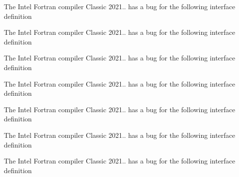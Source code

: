 
\begin{DoxyRefList}
\item[Type \mbox{\hyperlink{interfaceArrayFind__mod_1_1genReplaced}{Array\+Find\+\_\+mod\+::gen\+Replaced}} ]\label{bug__bug000001}%
%
 The Intel Fortran compiler Classic 2021.. has a bug for the following interface definition  
\item[Type \mbox{\hyperlink{interfaceArrayFind__mod_1_1getReplaced}{Array\+Find\+\_\+mod\+::get\+Replaced}} ]\label{bug__bug000002}%
%
 The Intel Fortran compiler Classic 2021.. has a bug for the following interface definition  
\item[Type \mbox{\hyperlink{interfaceArrayRemap__mod_1_1remap}{Array\+Remap\+\_\+mod\+::remap}} ]\label{bug__bug000003}%
%
 The Intel Fortran compiler Classic 2021.. has a bug for the following interface definition  
\item[Type \mbox{\hyperlink{interfaceArrayReplace__mod_1_1genReplaced}{Array\+Replace\+\_\+mod\+::gen\+Replaced}} ]\label{bug__bug000004}%
%
 The Intel Fortran compiler Classic 2021.. has a bug for the following interface definition  
\item[Type \mbox{\hyperlink{interfaceArrayReplace__mod_1_1getReplaced}{Array\+Replace\+\_\+mod\+::get\+Replaced}} ]\label{bug__bug000005}%
%
 The Intel Fortran compiler Classic 2021.. has a bug for the following interface definition  
\item[Type \mbox{\hyperlink{interfaceArrayUnique__mod_1_1genUnique}{Array\+Unique\+\_\+mod\+::gen\+Unique}} ]\label{bug__bug000006}%
%
 The Intel Fortran compiler Classic 2021.. has a bug for the following interface definition  
\item[Type \mbox{\hyperlink{interfaceArrayUnique__mod_1_1getUnique}{Array\+Unique\+\_\+mod\+::get\+Unique}} ]\label{bug__bug000007}%
%
 The Intel Fortran compiler Classic 2021.. has a bug for the following interface definition 
\end{DoxyRefList}